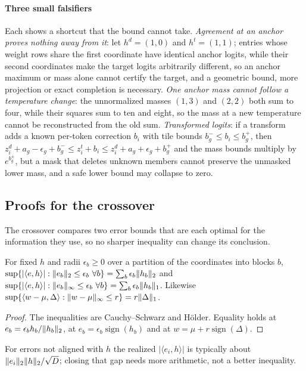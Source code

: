 \paragraph{Three small falsifiers} Each shows a shortcut that the bound cannot take. \emph{Agreement at an anchor proves nothing away from it}: let $h^d=(1,0)$ and $h^t=(1,1)$; entries whose weight rows share the first coordinate have identical anchor logits, while their second coordinates make the target logits arbitrarily different, so an anchor maximum or mass alone cannot certify the target, and a geometric bound, more projection or exact completion is necessary. \emph{One anchor mass cannot follow a temperature change}: the unnormalized masses $(1,3)$ and $(2,2)$ both sum to four, while their squares sum to ten and eight, so the mass at a new temperature cannot be reconstructed from the old sum. \emph{Transformed logits}: if a transform adds a known per-token correction $b_i$ with tile bounds $b_g^-\le b_i\le b_g^+$, then $z_i^d+a_g-\epsilon_g+b_g^-\le z_i^t+b_i\le z_i^d+a_g+\epsilon_g+b_g^+$ and the mass bounds multiply by $e^{b_g^\pm}$, but a mask that deletes unknown members cannot preserve the unmasked lower mass, and a safe lower bound may collapse to zero.

\subsection{Proofs for the crossover}\label{app:crossover}
The crossover compares two error bounds that are each optimal for the information they use, so no sharper inequality can change its conclusion.
\begin{proposition}\label{prop:suprema}
For fixed $h$ and radii $\epsilon_b\ge0$ over a partition of the coordinates into blocks $b$,
$\sup\{|\langle e,h\rangle|:\lVert e_b\rVert_2\le\epsilon_b\ \forall b\}=\sum_b\epsilon_b\lVert h_b\rVert_2$ and
$\sup\{|\langle e,h\rangle|:\lVert e_b\rVert_\infty\le\epsilon_b\ \forall b\}=\sum_b\epsilon_b\lVert h_b\rVert_1$.
Likewise $\sup\{\langle w-\mu,\Delta\rangle:\lVert w-\mu\rVert_\infty\le r\}=r\lVert \Delta\rVert_1$.
\end{proposition}
\begin{proof}
The inequalities are Cauchy--Schwarz and Hölder. Equality holds at $e_b=\epsilon_bh_b/\lVert h_b\rVert_2$, at $e_b=\epsilon_b\operatorname{sign}(h_b)$ and at $w=\mu+r\operatorname{sign}(\Delta)$.
\end{proof}
For errors not aligned with $h$ the realized $|\langle e_i,h\rangle|$ is typically about $\lVert e_i\rVert_2\lVert h\rVert_2/\sqrt D$; closing that gap needs more arithmetic, not a better inequality.

